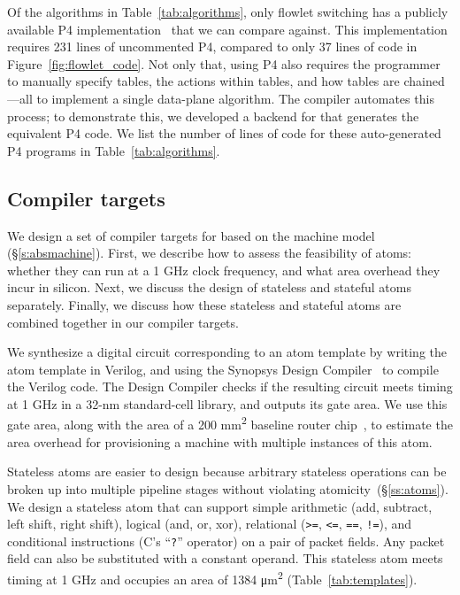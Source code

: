 Of the algorithms in Table~\ref{tab:algorithms}, only flowlet switching has a
publicly available P4 implementation~\cite{p4_flowlet} that we can compare
against. This implementation requires 231 lines of uncommented P4, compared to
only 37 lines of \pktlanguage code in Figure~\ref{fig:flowlet_code}. Not only
that, using P4 also requires the programmer to manually specify tables, the
actions within tables, and how tables are chained---all to implement a single
data-plane algorithm. The \pktlanguage compiler automates this process; to
demonstrate this, we developed a backend for \pktlanguage that generates the
equivalent P4 code. We list the number of lines of code for these
auto-generated P4 programs in Table~\ref{tab:algorithms}.
\subsection{Compiler targets}
\label{ss:targets}

We design a set of compiler targets for \pktlanguage based on the \absmachine
machine model (\S\ref{s:absmachine}). First, we describe how to assess the
feasibility of atoms: whether they can run at a 1 GHz clock frequency, and what
area overhead they incur in silicon. Next, we discuss the design of stateless
and stateful atoms separately. Finally, we discuss how these stateless and
stateful atoms are combined together in our compiler targets.

We synthesize a digital circuit corresponding to an atom template by writing
the atom template in Verilog, and using the Synopsys Design
Compiler~\cite{synopsys_dc} to compile the Verilog code. The Design Compiler
checks if the resulting circuit meets timing at 1 GHz in a 32-nm standard-cell
library, and outputs its gate area. We use this gate area, along with the area
of a 200 \si{\milli\metre\squared} baseline router chip~\cite{gibb_parsing},
to estimate the area overhead for provisioning a \absmachine machine with
multiple instances of this atom.


Stateless atoms are easier to design because arbitrary stateless operations can
be broken up into multiple pipeline stages without violating
atomicity~(\S\ref{ss:atoms}). We design a stateless atom that can support
simple arithmetic (add, subtract, left shift, right shift), logical (and, or,
xor), relational ({\tt >=}, {\tt <=}, {\tt ==}, {\tt !=}), and conditional
instructions (C's ``{\tt ?}'' operator) on a pair of packet fields. Any packet
field can also be substituted with a constant operand. This stateless atom
meets timing at 1 GHz and occupies an area of 1384 \si{\micro\meter\squared}
(Table~\ref{tab:templates}).

